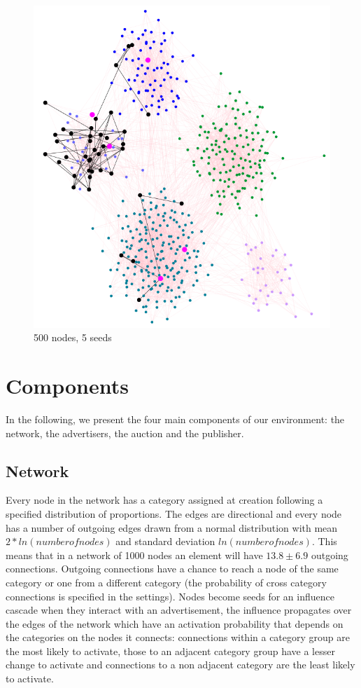 \documentclass{article}
\begin{document}
\begin{figure}[H]
\centering
\includegraphics[width=0.80\linewidth]{images/network-5seed.png}
\caption{500 nodes, 5 seeds}
\end{figure}



\section{Components}
In the following, we present the four main components of our environment: the network, the advertisers, the auction and the publisher.


\subsection{Network}
Every node in the network has a category assigned at creation following a specified distribution of proportions. The edges are directional and every node has a number of outgoing edges drawn from a normal distribution with mean $2 * ln(number of nodes)$ and standard deviation $ln(number of nodes)$. This means that in a network of 1000 nodes an element will have $13.8\pm6.9$ outgoing connections. Outgoing connections have a chance to reach a node of the same category or one from a different category (the probability of cross category connections is specified in the settings). Nodes become seeds for an influence cascade when they interact with an advertisement, the influence propagates over the edges of the network which have an activation probability that depends on the categories on the nodes it connects: connections within a category group are the most likely to activate, those to an adjacent category group have a lesser change to activate and connections to a non adjacent category are the least likely to activate.
\end{document}
